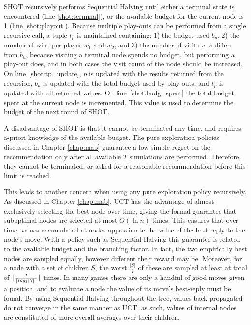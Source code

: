 \documentclass{icga}
\DeclarePairedDelimiter{\ceil}{\lceil}{\rceil}
\DeclarePairedDelimiter{\floor}{\lfloor}{\rfloor}
\begin{document}
SHOT recursively performs Sequential Halving until either a terminal state is encountered (line \ref{shot:terminal}), or the available budget for the current node is 1 (line \ref{shot:playout}). Because multiple play-outs can be performed from a single recursive call, a tuple $t_p$ is maintained containing: 1) the budget used $b_u$, 2) the number of wins per player $w_1$ and $w_2$, and 3) the number of visits $v$. $v$ differs from $b_u$, because visiting a terminal node spends no budget, but performing a play-out does, and in both cases the visit count of the node should be increased. On line~\ref{shot:tp_update}, $p$ is updated with the results returned from the recursion, $b_u$ is updated with the total budget used by play-outs, and $t_p$ is updated with all returned values. On line~\ref{shot:budg_spent} the total budget spent at the current node is incremented. This value is used to determine the budget of the next round of SHOT.

A disadvantage of SHOT is that it cannot be terminated any time, and requires a-priori knowledge of the available budget. The pure exploration policies discussed in Chapter \ref{chap:mab} guarantee a low simple regret on the recommendation only after all available $T$ simulations are performed. Therefore, they cannot be terminated, or asked for a reasonable recommendation before this limit is reached.

This leads to another concern when using any pure exploration policy recursively. As discussed in Chapter \ref{chap:mab}, UCT has the advantage of almost exclusively selecting the best node over time, giving the formal guarantee that suboptimal nodes are selected at most $O(\ln{n})$ times. This ensures that over time, values accumulated at nodes approximate the value of the best-reply to the node's move. With a policy such as Sequential Halving this guarantee is related to the available budget and the branching factor. In fact, the two empirically best nodes are sampled equally, however different their reward may be. Moreover, for a node with a set of children $S$, the worst $\frac{|S|}{2}$ of these are sampled at least at total of $\floor{\frac{T}{\ceil{log_2{|S|}}}}$ times. In many games there are only a handful of good moves given a position, and to evaluate a node the value of its move's best-reply must be found. By using Sequential Halving throughout the tree, values back-propagated do not converge in the same manner as UCT, as such, values of internal nodes are constituted of more overall averages over their children.
\end{document}
